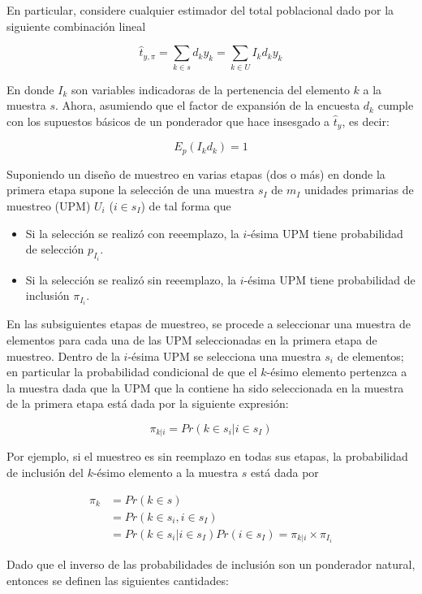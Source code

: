 \documentclass[
  12pt,
]{book}
\providecommand{\tightlist}{%
  \setlength{\itemsep}{0pt}\setlength{\parskip}{0pt}}
\begin{document}
En particular, considere cualquier estimador del total poblacional dado por la siguiente combinación lineal

\[
\hat{t}_{y,\pi}=\sum_{k\in s} d_k y_k = \sum_{k\in U} I_k d_k y_k 
\]

En donde \(I_k\) son variables indicadoras de la pertenencia del elemento \(k\) a la muestra \(s\). Ahora, asumiendo que el factor de expansión de la encuesta \(d_k\) cumple con los supuestos básicos de un ponderador que hace insesgado a \(\hat{t}_{y}\), es decir:

\[
E_p(I_k d_k) = 1
\]

Suponiendo un diseño de muestreo en varias etapas (dos o más) en donde la primera etapa supone la selección de una muestra \(s_I\) de \(m_I\) unidades primarias de muestreo (UPM) \(U_i\) (\(i\in s_I\)) de tal forma que

\begin{itemize}
\tightlist
\item
  Si la selección se realizó con reeemplazo, la \(i\)-ésima UPM tiene probabilidad de selección \(p_{I_i}\).
\item
  Si la selección se realizó sin reeemplazo, la \(i\)-ésima UPM tiene probabilidad de inclusión \(\pi_{I_i}\).
\end{itemize}

En las subsiguientes etapas de muestreo, se procede a seleccionar una muestra de elementos para cada una de las UPM seleccionadas en la primera etapa de muestreo. Dentro de la \(i\)-ésima UPM se selecciona una muestra \(s_i\) de elementos; en particular la probabilidad condicional de que el \(k\)-ésimo elemento pertenzca a la muestra dada que la UPM que la contiene ha sido seleccionada en la muestra de la primera etapa está dada por la siguiente expresión:

\[
\pi_{k|i} = Pr(k \in s_i | i \in s_I)
\]

Por ejemplo, si el muestreo es sin reemplazo en todas sus etapas, la probabilidad de inclusión del \(k\)-ésimo elemento a la muestra \(s\) está dada por

\begin{align*}
\pi_k & = Pr(k \in s)\\ 
& = Pr(k \in s_i, i \in s_I) \\
& = Pr(k \in s_i | i \in s_I) Pr(i \in s_I) = \pi_{k|i} \times \pi_{I_i}
\end{align*}

Dado que el inverso de las probabilidades de inclusión son un ponderador natural, entonces se definen las siguientes cantidades:
\end{document}
